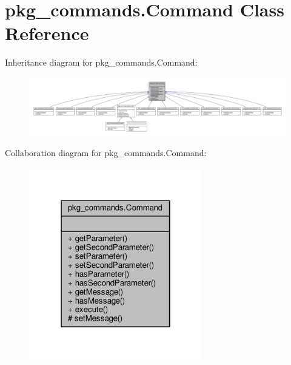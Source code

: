 \hypertarget{classpkg__commands_1_1Command}{\section{pkg\-\_\-commands.\-Command Class Reference}
\label{classpkg__commands_1_1Command}
}


Inheritance diagram for pkg\-\_\-commands.\-Command\-:
\nopagebreak
\begin{figure}[H]
\begin{center}
\leavevmode
\includegraphics[width=350pt]{classpkg__commands_1_1Command__inherit__graph}
\end{center}
\end{figure}


Collaboration diagram for pkg\-\_\-commands.\-Command\-:
\nopagebreak
\begin{figure}[H]
\begin{center}
\leavevmode
\includegraphics[width=214pt]{classpkg__commands_1_1Command__coll__graph}
\end{center}
\end{figure}
